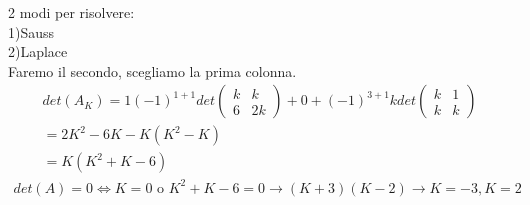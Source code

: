 \documentclass[a4paper,12pt]{article}
\begin{document}
2 modi per risolvere:
\\1)Sauss
\\2)Laplace
\\Faremo il secondo, scegliamo la prima colonna.
\begin{align*}
    det(A_K)=1(-1)^{1+1}det\begin{pmatrix}
        k&k\\6&2k
    \end{pmatrix}+0+(-1)^{3+1}kdet\begin{pmatrix}
        k&1\\k&k
    \end{pmatrix}
    \\ =2K^2-6K-K(K^2-K)
    \\ = K(K^2+K-6)
\end{align*}
\begin{align*}
    det(A)=0 \iff K=0 \text{ o } K^2+K-6=0 \to (K+3)(K-2) \to K=-3,K=2
\end{align*}
\end{document}
